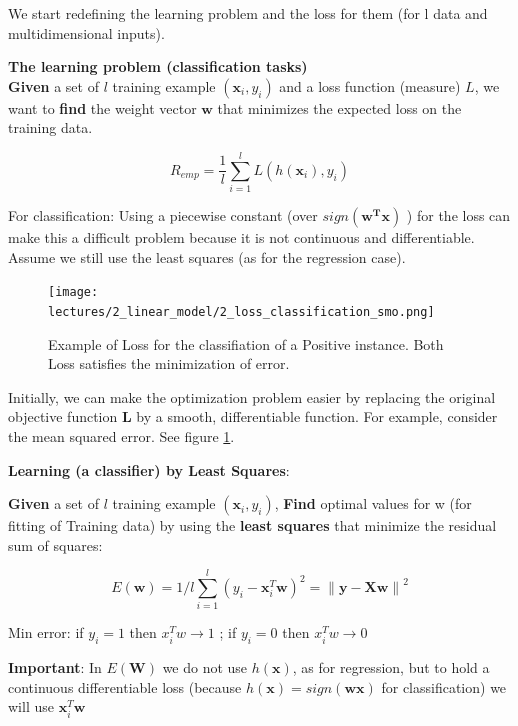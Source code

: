 \documentclass[../main.tex]{subfiles}
\begin{document}
We start redefining the learning problem and the loss for them (for l data and multidimensional inputs).

\textbf{The learning problem (classification tasks)}\\
\textbf{Given} a set of $l$ training example $( \mathbf{x}_i, y_i)$ and a loss function (measure) $L$, we want to \textbf{find} the weight vector $\textbf{w}$ that minimizes the expected loss on the training data.

$$ R_{emp} = \frac{1}{l}\sum_{i = 1}^{l} L(h(\mathbf{x}_i),y_i) $$

For classification: Using a piecewise constant (over $sign(\mathbf{w^Tx})$ ) for the loss can make this a difficult problem because it is not continuous and differentiable. Assume we still use the least squares (as for the regression case).

\begin{figure}[H]
    \centering
    \texttt{[image: lectures/2\_linear\_model/2\_loss\_classification\_smo.png]}
    \caption{\scriptsize Example of Loss for the classifiation of a Positive instance. Both Loss satisfies the minimization of error.}
    \label{fig:2_loss_classification_smo}
\end{figure}
Initially, we can make the optimization problem easier by replacing the original objective function \textbf{L} by a smooth, differentiable function. For example, consider the mean squared error. See figure \ref{fig:2_loss_classification_smo}.

\noindent \textbf{Learning (a classifier) by Least Squares}:

\noindent\textbf{Given} a set of $l$ training example $( \mathbf{x}_i, y_i)$, \textbf{Find} optimal values for w (for fitting of Training data) by using the \textbf{least squares} that minimize the residual sum of squares:

$$ E(\mathbf{w}) = 1/l \sum_{i = 1}^{l} (y_i - \mathbf{x}_i^T\mathbf{w})^2 = \left\lVert\mathbf{y} - \mathbf{Xw} \right\rVert ^2$$

\begin{center}
    Min error: if $y_i=1$ then $x_i^Tw\rightarrow 1$ ; if $y_i=0$ then  $x_i^Tw\rightarrow 0$
\end{center} 

\textbf{Important}: In $E(\mathbf{W})$ we do not use $h(\mathbf{x})$, as for regression, but to hold a continuous differentiable loss (because $h(\mathbf{x})=sign(\mathbf{wx})$ for classification) we will use $\mathbf{x}_i^T\mathbf{w}$
\end{document}
